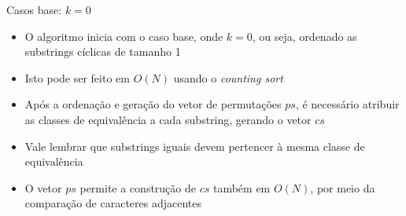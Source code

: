 \begin{frame}[fragile]{Casos base: $k = 0$}

    \begin{itemize}
        \item O algoritmo inicia com o caso base, onde $k = 0$, ou seja, ordenado as substrings
            cíclicas de tamanho 1

        \item Isto pode ser feito em $O(N)$ usando o \textit{counting sort}

        \item Após a ordenação e geração do vetor de permutações $ps$, é necessário atribuir
            as classes de equivalência a cada substring, gerando o vetor $cs$

        \item Vale lembrar que substrings iguais devem pertencer à mesma classe de
            equivalência

        \item O vetor $ps$ permite a construção de $cs$ também em $O(N)$, por meio da comparação
            de caracteres adjacentes
    \end{itemize}

\end{frame}

